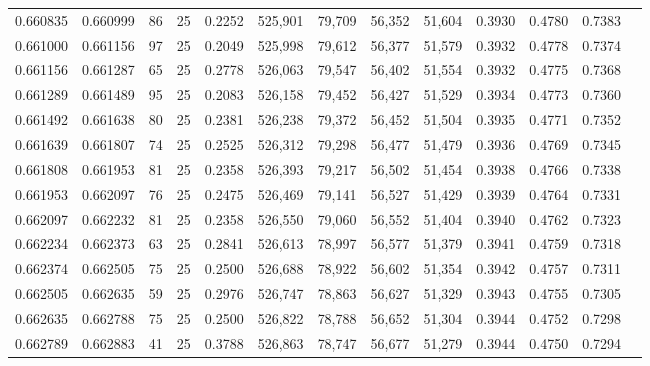 \begin{tabular}{rrrrrrrrrrrrr}
0.660835 & 0.660999 &    86 &  25 &                                     0.2252 & 525,901 &  79,709 &  56,352 &  51,604 & 0.3930 & 0.4780 & 0.7383 \\
0.661000 & 0.661156 &    97 &  25 &                                     0.2049 & 525,998 &  79,612 &  56,377 &  51,579 & 0.3932 & 0.4778 & 0.7374 \\
0.661156 & 0.661287 &    65 &  25 &                                     0.2778 & 526,063 &  79,547 &  56,402 &  51,554 & 0.3932 & 0.4775 & 0.7368 \\
0.661289 & 0.661489 &    95 &  25 &                                     0.2083 & 526,158 &  79,452 &  56,427 &  51,529 & 0.3934 & 0.4773 & 0.7360 \\
0.661492 & 0.661638 &    80 &  25 &                                     0.2381 & 526,238 &  79,372 &  56,452 &  51,504 & 0.3935 & 0.4771 & 0.7352 \\
0.661639 & 0.661807 &    74 &  25 &                                     0.2525 & 526,312 &  79,298 &  56,477 &  51,479 & 0.3936 & 0.4769 & 0.7345 \\
0.661808 & 0.661953 &    81 &  25 &                                     0.2358 & 526,393 &  79,217 &  56,502 &  51,454 & 0.3938 & 0.4766 & 0.7338 \\
0.661953 & 0.662097 &    76 &  25 &                                     0.2475 & 526,469 &  79,141 &  56,527 &  51,429 & 0.3939 & 0.4764 & 0.7331 \\
0.662097 & 0.662232 &    81 &  25 &                                     0.2358 & 526,550 &  79,060 &  56,552 &  51,404 & 0.3940 & 0.4762 & 0.7323 \\
0.662234 & 0.662373 &    63 &  25 &                                     0.2841 & 526,613 &  78,997 &  56,577 &  51,379 & 0.3941 & 0.4759 & 0.7318 \\
0.662374 & 0.662505 &    75 &  25 &                                     0.2500 & 526,688 &  78,922 &  56,602 &  51,354 & 0.3942 & 0.4757 & 0.7311 \\
0.662505 & 0.662635 &    59 &  25 &                                     0.2976 & 526,747 &  78,863 &  56,627 &  51,329 & 0.3943 & 0.4755 & 0.7305 \\
0.662635 & 0.662788 &    75 &  25 &                                     0.2500 & 526,822 &  78,788 &  56,652 &  51,304 & 0.3944 & 0.4752 & 0.7298 \\
0.662789 & 0.662883 &    41 &  25 &                                     0.3788 & 526,863 &  78,747 &  56,677 &  51,279 & 0.3944 & 0.4750 & 0.7294 \\

\end{tabular}
